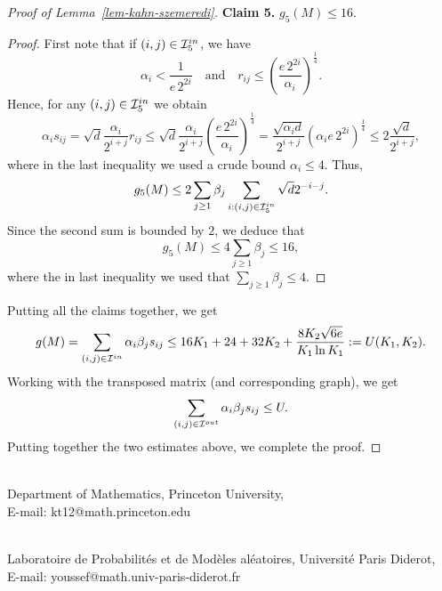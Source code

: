 \documentclass[12pt]{article}
\theoremstyle{definition}
\theoremstyle{plain}
\def\InI{{\cal{I}}^{in}}
\def\OutI{{\cal{I}}^{out}}
\begin{document}
\begin{proof}[Proof of Lemma~\ref{lem-kahn-szemeredi}]
\medskip

\noindent\textbf{Claim 5.} $g_5(M)\leq 16$.
\begin{proof}
First note that if $(i,j)\in \InI_5$, we have 
$$
\alpha_i< \frac{1}{e\, 2^{2i}}\quad \text{and} \quad r_{ij}\leq \left(\frac{e\, 2^{2i}}{\alpha_i}\right)^{\frac14}.
$$
Hence, for any $(i,j)\in\InI_5$ we obtain
$$
\alpha_i s_{ij}=\sqrt{d} \frac{\alpha_i}{2^{i+j}}r_{ij}\leq \sqrt{d} \frac{\alpha_i}{2^{i+j}}\left(\frac{e\, 2^{2i}}{\alpha_i}\right)^{\frac14} 
=\frac{\sqrt{\alpha_i d}}{2^{i+j}} \left(\alpha_i e\, 2^{2i}\right)^{\frac14}\leq 2\frac{\sqrt{d}}{2^{i+j}},
$$
where in the last inequality we used a crude bound $\alpha_i\leq 4$. 
Thus,
$$
g_5(M)\leq 2 \sum_{j\geq 1}\beta_j\sum_{i:(i,j)\in \InI_5} \sqrt{d}2^{-i-j}.
$$
Since the second sum is bounded by $2$, we deduce that 
$$
g_5(M)\leq 4\sum_{j\geq 1}\beta_j \leq 16,
$$
where the in last inequality we used that $\sum_{j\geq 1}\beta_j\leq 4$. 
\end{proof}

\medskip

Putting all the claims together, we get 
$$
g(M)=\sum_{(i,j)\in\InI}\alpha_i\beta_js_{ij}\leq
16K_1+24+32K_2+\frac{8K_2\sqrt{6e}}{K_1 \ln K_1}:=U(K_1,K_2).
$$
Working with the transposed matrix (and corresponding graph), we get
$$
\sum_{(i,j)\in\OutI}\alpha_i\beta_js_{ij}\leq U.
$$
Putting together the two estimates above, we complete the proof.
\end{proof}

\bigskip

\\
{\small Department of Mathematics, Princeton University,}\\
{\small E-mail: kt12@math.princeton.edu}

\bigskip

\\
{\small Laboratoire de Probabilit\'es et de Mod\`eles al\'eatoires,
Universit\'e Paris Diderot,}\\
{\small E-mail: youssef@math.univ-paris-diderot.fr}
\end{document}
